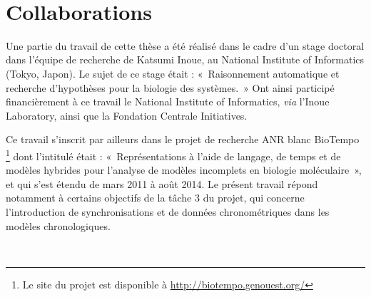 
\cleardoublepage

~

\vfill

\section*{Collaborations}

Une partie du travail de cette thèse a été réalisé dans le cadre d'un stage doctoral
dans l'équipe de recherche de Katsumi Inoue,
au National Institute of Informatics (Tokyo, Japon).
Le sujet de ce stage était :
«~Raisonnement automatique et recherche d'hypothèses pour la biologie des systèmes.~»
Ont ainsi participé financièrement à ce travail le National Institute of Informatics,
\textit{via} l'Inoue Laboratory,
ainsi que la Fondation Centrale Initiatives.

\bigskip

\noindent
Ce travail s'inscrit par ailleurs dans le projet de recherche ANR blanc BioTempo%
\footnote{Le site du projet est disponible à \url{http://biotempo.genouest.org/}}
dont l'intitulé était : «~Représentations à l'aide de langage, de temps et de modèles hybrides
pour l'analyse de modèles incomplets en biologie moléculaire~»,
et qui s'est étendu de mars 2011 à août 2014.
Le présent travail répond notamment à certains objectifs de la tâche 3 du projet,
qui concerne l'introduction de synchronisations et de données chronométriques
dans les modèles chronologiques.

\vfill

~

\cleardoublepage
